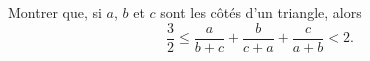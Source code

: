 Montrer que, si $a$, $b$ et $c$ sont les côtés d'un triangle, alors
\[ \frac{3}{2} \leq \frac{a}{b + c} + \frac{b}{c + a} + \frac{c}{a + b} < 2. \]
